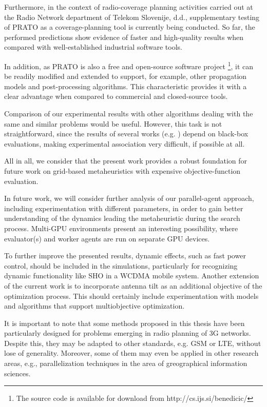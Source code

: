 Furthermore, in the context of radio-coverage planning activities
carried out at the Radio Network department of Telekom Slovenije,
d.d., supplementary testing of PRATO as a coverage-planning tool is
currently being conducted. So far, the performed predictions show
evidence of faster and high-quality results when compared with well-established
industrial software tools.

In addition, as PRATO is also a free and open-source software project%
\footnote{The source code is available for download from http://cs.ijs.si/benedicic/%
}, it can be readily modified and extended to support, for example,
other propagation models and post-processing algorithms. This characteristic
provides it with a clear advantage when compared to commercial and
closed-source tools.

Comparison of our experimental results with other algorithms dealing
with the same and similar problems would be useful. However, this
task is not straightforward, since the results of several works (e.g.
\cite{Gerdenitsch_PhD:2004,Turke_Advanced.site.configuration.techniques:2005})
depend on black-box evaluations, making experimental association very
difficult, if possible at all. 

All in all, we consider that the present work provides a robust foundation
for future work on grid-based metaheuristics with expensive objective-function
evaluation.

In future work, we will consider further analysis of our parallel-agent
approach, including experimentation with different parameters, in
order to gain better understanding of the dynamics leading the metaheuristic
during the search process. Multi-GPU environments present an interesting
possibility, where evaluator(s) and worker agents are run on separate
GPU devices.

To further improve the presented results, dynamic effects, such as
fast power control, should be included in the simulations, particularly
for recognizing dynamic functionality like SHO in a WCDMA mobile system.
Another extension of the current work is to incorporate antenna tilt
as an additional objective of the optimization process. This should
certainly include experimentation with models and algorithms that
support multiobjective optimization.

It is important to note that some methods proposed in this thesis
have been particularly designed for problems emerging in radio planning
of 3G networks. Despite this, they may be adapted to other standards,
e.g. GSM or LTE, without lose of generality. Moreover, some of them
may even be applied in other research areas, e.g., parallelization
techniques in the area of greographical information sciences.

